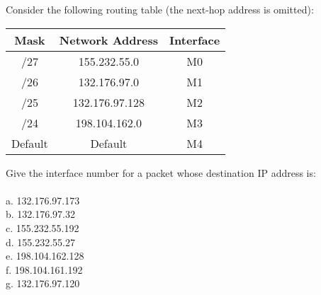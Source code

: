 \documentclass[12pt]{article}
\newenvironment{exercise}[2][Exercise]{\begin{trivlist}
\item[\hskip \labelsep {\bfseries #1}\hskip \labelsep {\bfseries #2.}]}{\end{trivlist}}
\begin{document}
\begin{exercise}{6}
Consider the following routing table (the next-hop address is omitted): \\

\begin{center}
\begin{tabular}{ |c|c|c| } 
 \hline
 Mask & Network Address & Interface \\ 
 \hline 
 /27 & 155.232.55.0 & M0 \\
 \hline 
 /26 & 132.176.97.0 & M1 \\
 \hline 
 /25 & 132.176.97.128 & M2 \\
 \hline 
 /24 & 198.104.162.0 & M3 \\ 
 \hline 
 Default & Default & M4 \\
 \hline
\end{tabular}
\end{center}
Give the interface number for a packet whose destination IP address is: \\ \\
a. 132.176.97.173 \\
b. 132.176.97.32 \\
c. 155.232.55.192 \\
d. 155.232.55.27 \\
e. 198.104.162.128 \\
f. 198.104.161.192 \\
g. 132.176.97.120
\end{exercise}
\end{document}
